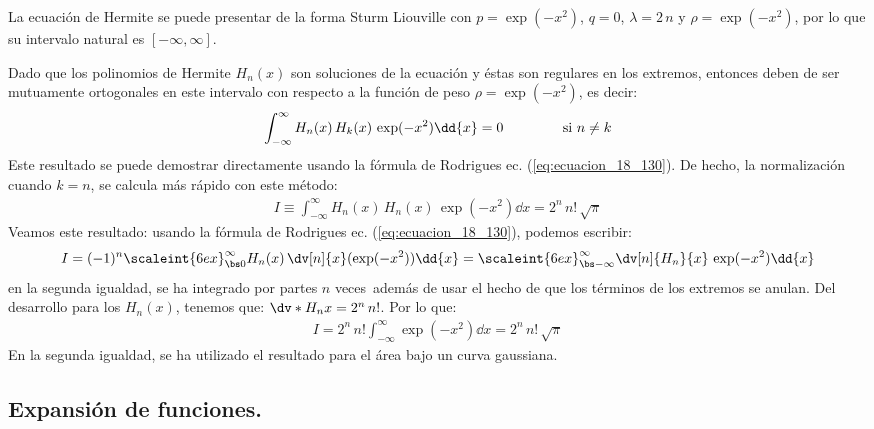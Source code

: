 La ecuación de Hermite se puede presentar de la forma Sturm Liouville con $p = \exp(-x^{2})$, $q = 0$, $\lambda = 2 \, n$ y $\rho = \exp(-x^{2})$, por lo que su intervalo natural es $[-\infty, \infty]$.
\par
Dado que los polinomios de Hermite $H_{n}(x)$ son soluciones de la ecuación y éstas son regulares en los extremos, entonces deben de ser mutuamente ortogonales en este intervalo con respecto a la función de peso $\rho = \exp(-x^{2})$, es decir:
\begin{align*}
\int_{-\infty}^{\infty} H_{n} (x) \, H_{k} (x) \, \exp(-x^{2}) \dd{x} = 0 \hspace{1.5cm} \mbox{si } n \neq k
\end{align*}
Este resultado se puede demostrar directamente usando la fórmula de Rodrigues ec. (\ref{eq:ecuacion_18_130}). De hecho, la normalización cuando $k = n$, se calcula más rápido con este método:
\begin{align}
I \equiv \int_{-\infty}^{\infty} H_{n}(x) \, H_{n}(x) \, \exp( -x^{2}) \dd{x} = 2^{n} \, n! \, \sqrt{\pi}
\label{eq:ecuacion_18_132}
\end{align}
Veamos este resultado: usando la fórmula de Rodrigues ec. (\ref{eq:ecuacion_18_130}), podemos escribir:
\begin{align*}
I = (-1)^{n} \scaleint{6ex}_{\bs 0}^{\infty} H_{n}(x) \, \dv[n]{x} (\exp(-x^{2})) \dd{x} = \scaleint{6ex}_{\bs -\infty}^{\infty} \dv[n]{H_{n}}{x} \, \exp(-x^{2}) \dd{x}
\end{align*}
en la segunda igualdad, se ha integrado por partes $n$ veces además de usar el hecho de que los términos de los extremos se anulan. Del desarrollo para los $H_{n}(x)$, tenemos que: $\dv*{H_{n}}{x} = 2^{n} \, n!$. Por lo que:
\begin{align*}
I = 2^{n} \, n! \int_{-\infty}^{\infty} \exp(-x^{2}) \dd{x} = 2^{n} \, n! \, \sqrt{\pi}
\end{align*}
En la segunda igualdad, se ha utilizado el resultado para el área bajo un curva gaussiana.

\subsection{Expansión de funciones.}

